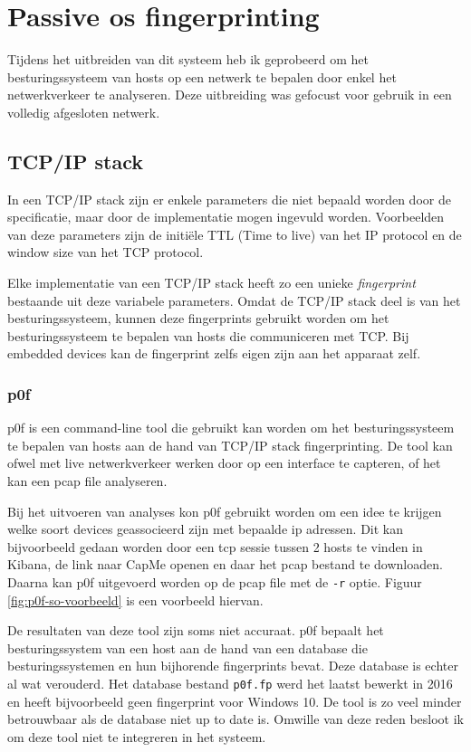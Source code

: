 \documentclass[a4paper,12pt]{report}
\begin{document}
\section{Passive os fingerprinting}
Tijdens het uitbreiden van dit systeem heb ik geprobeerd om het besturingssysteem van hosts op een netwerk te bepalen door enkel het netwerkverkeer te analyseren.
Deze uitbreiding was gefocust voor gebruik in een volledig afgesloten netwerk.
\subsection{TCP/IP stack}
In een TCP/IP stack zijn er enkele parameters die niet bepaald worden door de specificatie, maar door de implementatie mogen ingevuld worden.
Voorbeelden van deze parameters zijn de initiële TTL (Time to live) van het IP protocol en de window size van het TCP protocol.
\autocite{wikipedia:fingerprinting}

Elke implementatie van een TCP/IP stack heeft zo een unieke \emph{fingerprint} bestaande uit deze variabele parameters.
Omdat de TCP/IP stack deel is van het besturingssysteem, kunnen deze fingerprints gebruikt worden om het besturingssysteem te bepalen van hosts die communiceren met TCP.
Bij embedded devices kan de fingerprint zelfs eigen zijn aan het apparaat zelf.

\subsubsection{p0f}
p0f is een command-line tool die gebruikt kan worden om het besturingssysteem te bepalen van hosts aan de hand van TCP/IP stack fingerprinting.
De tool kan ofwel met live netwerkverkeer werken door op een interface te capteren, of het kan een pcap file analyseren.

Bij het uitvoeren van analyses kon p0f gebruikt worden om een idee te krijgen welke soort devices geassocieerd zijn met bepaalde ip adressen.
Dit kan bijvoorbeeld gedaan worden door een tcp sessie tussen 2 hosts te vinden in Kibana, de link naar CapMe openen en daar het pcap bestand te downloaden.
Daarna kan p0f uitgevoerd worden op de pcap file met de \lstinline|-r| optie.
Figuur \ref{fig:p0f-so-voorbeeld} is een voorbeeld hiervan.

De resultaten van deze tool zijn soms niet accuraat.
p0f bepaalt het besturingssystem van een host aan de hand van een database die besturingssystemen en hun bijhorende fingerprints bevat.
Deze database is echter al wat verouderd.
Het database bestand \lstinline|p0f.fp| werd het laatst bewerkt in 2016 en heeft bijvoorbeeld geen fingerprint voor Windows 10.
De tool is zo veel minder betrouwbaar als de database niet up to date is.
Omwille van deze reden besloot ik om deze tool niet te integreren in het systeem.
\end{document}
